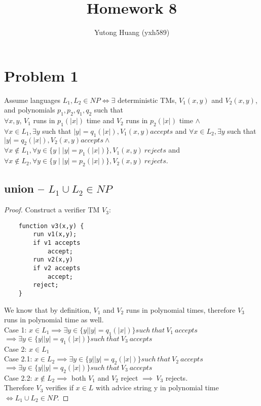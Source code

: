 \documentclass[letterpaper]{article}
\title{\vspace{-2cm}Homework 8}
\author{Yutong Huang (yxh589)}
\date{}
\begin{document}
\maketitle

\section*{Problem 1}
Assume languages $L_1, L_2 \in NP \iff \exists$ deterministic TMs, $V_1(x, y)$ and $V_2(x, y)$, and polynomials $p_1, p_2, q_1, q_2$ such that\\
$\forall x, y$, $V_1$ runs in $p_1(|x|)$ time and $V_2$ runs in $p_2(|x|)$ time $\land$\\
$\forall x \in L_1, \exists y$ such that $|y|=q_1(|x|), V_1(x, y) accepts$ and $\forall x \in L_2, \exists y$ such that $|y|=q_2(|x|), V_2(x, y) accepts\land$\\
$\forall x \notin L_1, \forall y \in \{y \mid |y| = p_1(|x|)\}, V_1(x, y)\ rejects$ and $\forall x \notin L_2, \forall y \in \{y \mid |y| = p_2(|x|)\}, V_2(x, y)\ rejects$.
\subsection*{union -- $L_1 \cup L_2 \in NP$}
\begin{proof}
    Construct a verifier TM $V_3$:
    \begin{verbatim}
    function v3(x,y) {
        run v1(x,y);
        if v1 accepts
            accept;
        run v2(x,y)
        if v2 accepts
            accept;
        reject;
    }
\end{verbatim}
    We know that by definition, $V_1$ and $V_2$ runs in polynomial times, therefore $V_3$ runs in polynomial time as well.\\

    Case 1: $x\in L_1 \implies \exists y \in \{y||y| = q_1(|x|)\} such\ that\ V_1\ accepts$ $\implies \exists y \in \{y||y| = q_1(|x|)\} such\ that\ V_3\ accepts$\\
    Case 2: $x\in L_1$\\
    Case 2.1: $x \in L_2\implies \exists y \in \{y||y| = q_2(|x|)\} such\ that\ V_2\ accepts$ $\implies \exists y \in \{y||y| = q_2(|x|)\} such\ that\ V_3\ accepts$\\
    Case 2.2: $x \notin L_2 \implies$ both $V_1$ and $V_2$ reject $\implies\ V_3$ rejects.\\

    Therefore $V_3$ verifies if $x\in L$ with advice string y in polynomial time $\iff L_1 \cup L_2 \in NP$.
\end{proof}
\end{document}
